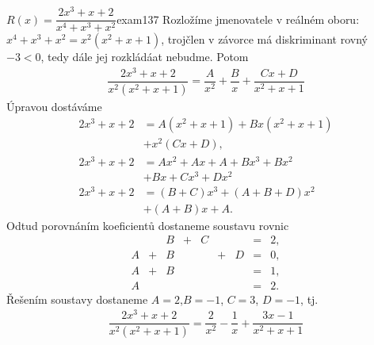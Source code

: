 \begin{mathexam}{\(R(x) = \dfrac{2x^3 + x + 2}{x^4 + x^3 + x^2}\)}{exam137} 
  Rozložíme jmenovatele v reálném oboru: \(x^4+x^3+x^2 = x^2(x^2 + x + 1)\), trojčlen v závorce má
  diskriminant rovný \(-3<0\), tedy dále jej rozkládáat nebudme. Potom
  \begin{gather*}
    \dfrac{2x^3+x+2}{x^2(x^2+x+1)} = \dfrac{A}{x^2} + \dfrac{B}{x} + \dfrac{Cx+D}{x^2+x+1}
  \end{gather*}
  Úpravou dostáváme
  \begin{align*}
    2x^3+x+2 &= A(x^2+x+1) + Bx(x^2+x+1)     \\ 
             &+ x^2(Cx+D),                   \\
    2x^3+x+2 &= Ax^2 + Ax + A + Bx^3 + Bx^2  \\
             &+ Bx + Cx^3 + Dx^2             \\
    2x^3+x+2 &= (B+C)x^3 + (A+B+D)x^2        \\
             &+ (A+B)x +A.
  \end{align*}
  Odtud porovnáním koeficientů dostaneme soustavu rovnic
  \begin{equation*}
    \begin{array}{rcrcrcrcl}
        & & B &+& C & &   &=& 2,  \\
      A &+& B & &   &+& D &=& 0,  \\
      A &+& B & &   & &   &=& 1,  \\
      A & &   & &   & &   &=& 2.
    \end{array}
  \end{equation*}
  Řešením soustavy dostaneme \(A=2\),\(B = -1\), \(C=3\), \(D=-1\), tj.  
  \begin{gather*}
    \dfrac{2x^3+x+2}{x^2(x^2+x+1)} = \dfrac{2}{x^2} - \dfrac{1}{x} + \dfrac{3x-1}{x^2+x+1}
  \end{gather*}
\end{mathexam}